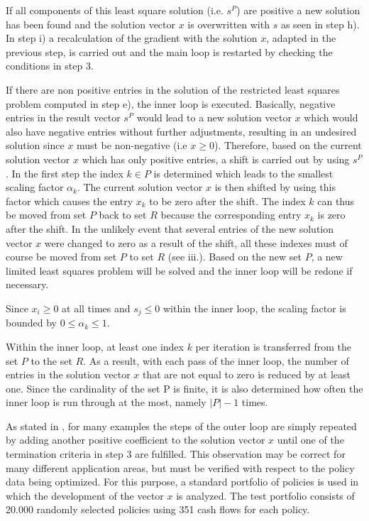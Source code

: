 If all components of this least square solution (i.e. $s^P$) are positive a new solution has been found and the solution vector $x$ is overwritten with $s$ as seen in step h). In step i) a recalculation of the gradient with the solution $x$, adapted in the previous step, is carried out and the main loop is restarted by checking the conditions in step 3. 

If there are non positive entries in the solution of the restricted least squares problem computed in step e), the inner loop is executed. Basically, negative entries in the result vector $s^P$ would lead to a new solution vector $x$ which would also have negative entries without further adjustments, resulting in an undesired solution since $x$ must be non-negative (i.e $x \geq 0$). Therefore, based on the current solution vector $x$ which has only positive entries, a shift is carried out by using $s^P$. In the first step the index $k \in P$ is determined which leads to the smallest scaling factor $\alpha_k$. The current solution vector $x$ is then shifted by using this factor which causes the entry $x_k$ to be zero after the shift. The index $k$ can thus be moved from set $P$ back to set $R$ because the corresponding entry $x_k$ is zero after the shift. In the unlikely event that several entries of the new solution vector $x$ were changed to zero as a result of the shift, all these indexes must of course be moved from set $P$ to set $R$ (see iii.). Based on the new set $P$, a new limited least squares problem will be solved and the inner loop will be redone if necessary.

\begin{remark}
	Since $x_i \geq 0$ at all times and $s_j \leq 0$ within the inner loop, the scaling factor is bounded by $0 \leq \alpha_k \leq 1$.  
\end{remark}

\begin{remark}
	Within the inner loop, at least one index $k$ per iteration is transferred from the set $P$ to the set $R$.  As a result, with each pass of the inner loop, the number of entries in the solution vector $x$ that are not equal to zero is reduced by at least one. Since the cardinality of the set P is finite, it is also determined how often the inner loop is run through at the most, namely $|P| - 1$ times.
\end{remark}

As stated in \cite[p.~163]{lawson}, for many examples the steps of the outer loop are simply repeated by adding another positive coefficient to the solution vector $x$ until one of the termination criteria in step 3 are fulfilled. This observation may be correct for many different application areas, but must be verified with respect to the policy data being optimized. For this purpose, a standard portfolio of policies is used in which the development of the vector $x$ is analyzed. The test portfolio consists of 20.000 randomly selected policies using 351 cash flows for each policy. 

